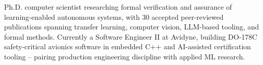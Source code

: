 


\begin{cvparagraph}
Ph.D. computer scientist researching formal verification and assurance of learning-enabled autonomous systems, with 30 accepted peer-reviewed publications spanning transfer learning, computer vision, LLM-based tooling, and formal methods. Currently a Software Engineer II at Avidyne, building DO-178C safety-critical avionics software in embedded C++ and AI-assisted certification tooling -- pairing production engineering discipline with applied ML research.
\end{cvparagraph}
